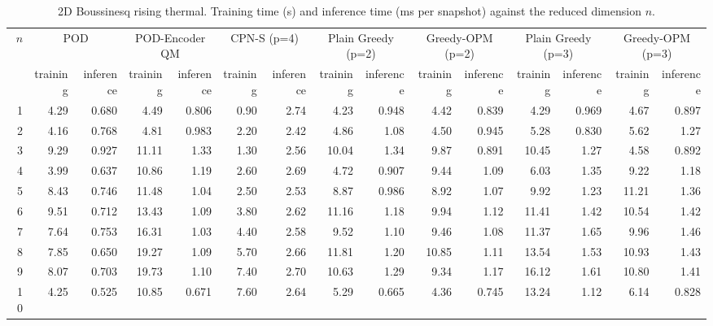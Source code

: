 \begin{table}[tb]
  \centering
  \caption{2D Boussinesq rising thermal. Training time (s) and inference time (ms per snapshot) against the reduced dimension \( n \).}
  \label{tab:boussinesq_timings}
  \small
  \setlength{\tabcolsep}{4pt}
  \begin{tabular}{rrrrrrrrrrrrrrr}
    \toprule
    \multirow{2}{*}{\( n \)} & \multicolumn{2}{c}{POD} & \multicolumn{2}{c}{POD-Encoder QM} & \multicolumn{2}{c}{CPN-S (p=4)} & \multicolumn{2}{c}{Plain Greedy (p=2)} & \multicolumn{2}{c}{Greedy-OPM (p=2)} & \multicolumn{2}{c}{Plain Greedy (p=3)} & \multicolumn{2}{c}{Greedy-OPM (p=3)} \\
    \cmidrule(lr){2-3} \cmidrule(lr){4-5} \cmidrule(lr){6-7} \cmidrule(lr){8-9} \cmidrule(lr){10-11} \cmidrule(lr){12-13} \cmidrule(lr){14-15}
     & training & inference & training & inference & training & inference & training & inference & training & inference & training & inference & training & inference \\
    \midrule
    1 & 4.29 & 0.680 & 4.49 & 0.806 & 0.90 & 2.74 & 4.23 & 0.948 & 4.42 & 0.839 & 4.29 & 0.969 & 4.67 & 0.897 \\
    2 & 4.16 & 0.768 & 4.81 & 0.983 & 2.20 & 2.42 & 4.86 & 1.08 & 4.50 & 0.945 & 5.28 & 0.830 & 5.62 & 1.27 \\
    3 & 9.29 & 0.927 & 11.11 & 1.33 & 1.30 & 2.56 & 10.04 & 1.34 & 9.87 & 0.891 & 10.45 & 1.27 & 4.58 & 0.892 \\
    4 & 3.99 & 0.637 & 10.86 & 1.19 & 2.60 & 2.69 & 4.72 & 0.907 & 9.44 & 1.09 & 6.03 & 1.35 & 9.22 & 1.18 \\
    5 & 8.43 & 0.746 & 11.48 & 1.04 & 2.50 & 2.53 & 8.87 & 0.986 & 8.92 & 1.07 & 9.92 & 1.23 & 11.21 & 1.36 \\
    6 & 9.51 & 0.712 & 13.43 & 1.09 & 3.80 & 2.62 & 11.16 & 1.18 & 9.94 & 1.12 & 11.41 & 1.42 & 10.54 & 1.42 \\
    7 & 7.64 & 0.753 & 16.31 & 1.03 & 4.40 & 2.58 & 9.52 & 1.10 & 9.46 & 1.08 & 11.37 & 1.65 & 9.96 & 1.46 \\
    8 & 7.85 & 0.650 & 19.27 & 1.09 & 5.70 & 2.66 & 11.81 & 1.20 & 10.85 & 1.11 & 13.54 & 1.53 & 10.93 & 1.43 \\
    9 & 8.07 & 0.703 & 19.73 & 1.10 & 7.40 & 2.70 & 10.63 & 1.29 & 9.34 & 1.17 & 16.12 & 1.61 & 10.80 & 1.41 \\
    10 & 4.25 & 0.525 & 10.85 & 0.671 & 7.60 & 2.64 & 5.29 & 0.665 & 4.36 & 0.745 & 13.24 & 1.12 & 6.14 & 0.828 \\
    \bottomrule
  \end{tabular}
\end{table}
